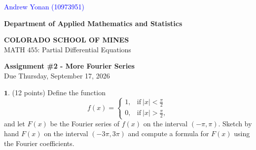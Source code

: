 \documentclass[12pt]{article}
\begin{document}
\textcolor{blue}{Andrew Yonan (10973951)}
\begin{flushleft}

\textbf{Department of Applied Mathematics and Statistics}

\textbf{COLORADO SCHOOL OF MINES}\\


MATH $455$: Partial Differential Equations
\end{flushleft}

\vspace{0.1in}

\begin{center}
{\bf Assignment \#2 - More Fourier Series} \\
Due Thursday, September 17, 2026 \\
\end{center}

\vspace{0.3in}

\noindent $\textbf{1}$. (12 points) Define the function
$$f(x) =
\begin{cases}
	1, & \mathrm{if} \ |x| < \frac{\pi}{2} \\ 
	0, & \mathrm{if} \ |x| > \frac{\pi}{2},
\end{cases}$$
and let $F(x)$ be the Fourier series of $f(x)$ on the interval $(-\pi, \pi)$. Sketch by hand $F(x)$ on the interval $(-3\pi, 3\pi)$ and compute a formula for $F(x)$ using the Fourier coefficients. \\
\end{document}

